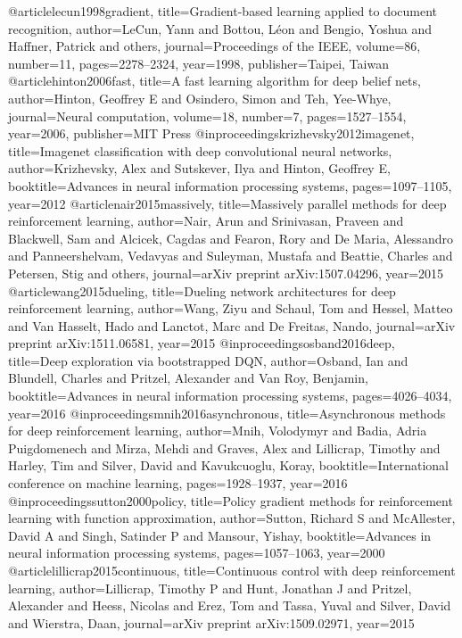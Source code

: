 @article{lecun1998gradient,
  title={Gradient-based learning applied to document recognition},
  author={LeCun, Yann and Bottou, L{\'e}on and Bengio, Yoshua and Haffner, Patrick and others},
  journal={Proceedings of the IEEE},
  volume={86},
  number={11},
  pages={2278--2324},
  year={1998},
  publisher={Taipei, Taiwan}
}
@article{hinton2006fast,
  title={A fast learning algorithm for deep belief nets},
  author={Hinton, Geoffrey E and Osindero, Simon and Teh, Yee-Whye},
  journal={Neural computation},
  volume={18},
  number={7},
  pages={1527--1554},
  year={2006},
  publisher={MIT Press}
}
@inproceedings{krizhevsky2012imagenet,
  title={Imagenet classification with deep convolutional neural networks},
  author={Krizhevsky, Alex and Sutskever, Ilya and Hinton, Geoffrey E},
  booktitle={Advances in neural information processing systems},
  pages={1097--1105},
  year={2012}
}
@article{nair2015massively,
  title={Massively parallel methods for deep reinforcement learning},
  author={Nair, Arun and Srinivasan, Praveen and Blackwell, Sam and Alcicek, Cagdas and Fearon, Rory and De Maria, Alessandro and Panneershelvam, Vedavyas and Suleyman, Mustafa and Beattie, Charles and Petersen, Stig and others},
  journal={arXiv preprint arXiv:1507.04296},
  year={2015}
}
@article{wang2015dueling,
  title={Dueling network architectures for deep reinforcement learning},
  author={Wang, Ziyu and Schaul, Tom and Hessel, Matteo and Van Hasselt, Hado and Lanctot, Marc and De Freitas, Nando},
  journal={arXiv preprint arXiv:1511.06581},
  year={2015}
}
@inproceedings{osband2016deep,
  title={Deep exploration via bootstrapped DQN},
  author={Osband, Ian and Blundell, Charles and Pritzel, Alexander and Van Roy, Benjamin},
  booktitle={Advances in neural information processing systems},
  pages={4026--4034},
  year={2016}
}
@inproceedings{mnih2016asynchronous,
  title={Asynchronous methods for deep reinforcement learning},
  author={Mnih, Volodymyr and Badia, Adria Puigdomenech and Mirza, Mehdi and Graves, Alex and Lillicrap, Timothy and Harley, Tim and Silver, David and Kavukcuoglu, Koray},
  booktitle={International conference on machine learning},
  pages={1928--1937},
  year={2016}
}
@inproceedings{sutton2000policy,
  title={Policy gradient methods for reinforcement learning with function approximation},
  author={Sutton, Richard S and McAllester, David A and Singh, Satinder P and Mansour, Yishay},
  booktitle={Advances in neural information processing systems},
  pages={1057--1063},
  year={2000}
}
@article{lillicrap2015continuous,
  title={Continuous control with deep reinforcement learning},
  author={Lillicrap, Timothy P and Hunt, Jonathan J and Pritzel, Alexander and Heess, Nicolas and Erez, Tom and Tassa, Yuval and Silver, David and Wierstra, Daan},
  journal={arXiv preprint arXiv:1509.02971},
  year={2015}
}
